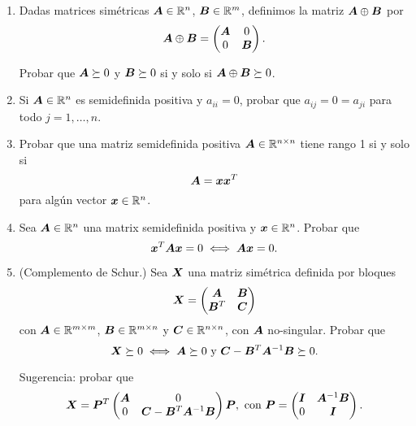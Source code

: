 \documentclass[11pt]{article}
\begin{document}
\begin{enumerate}[resume]
\item
Dadas matrices simétricas $\bm{A} \in \mathbb{R}^{n}$, $\bm{B} \in \mathbb{R}^{m}$, definimos la matriz $\bm{A} \oplus \bm{B}$ por
$$
\bm{A} \oplus \bm{B} =
\begin{pmatrix}
\bm{A} & 0 \\
0 & \bm{B}
\end{pmatrix}.
$$

Probar que $\bm{A} \succeq 0$ y $\bm{B} \succeq 0$ si y solo si $\bm{A} \oplus \bm{B} \succeq 0$.

\item Si $\bm{A} \in \mathbb{R}^{n}$ es semidefinida positiva y $a_{ii} = 0$, probar que $a_{ij} = 0 = a_{ji}$ para todo $j = 1, \dots, n$.

\item Probar que una matriz semidefinida positiva $\bm{A} \in \mathbb{R}^{n\times n}$ tiene rango 1 si y solo si
$$\bm{A} = \bm{x} \bm{x}^T$$
para algún vector $\bm{x} \in \mathbb{R}^{n}$.

\item Sea $\bm{A} \in \mathbb{R}^{n}$ una matrix semidefinida positiva y $\bm{x} \in \mathbb{R}^{n}$. Probar que
$$
\bm{x}^T \bm{A} \bm{x} = 0 \iff \bm{A} \bm{x} = 0.
$$

\item (Complemento de Schur.) Sea $\bm{X}$ una matriz simétrica definida por bloques
$$
\bm{X} = \begin{pmatrix}
\bm{A} & \bm{B} \\
\bm{B}^T & \bm{C}
\end{pmatrix}
$$
con $\bm{A} \in \mathbb{R}^{m \times m}$, $\bm{B} \in \mathbb{R}^{m \times n}$ y $\bm{C} \in \mathbb{R}^{n\times n}$, con $\bm{A}$ no-singular. Probar que
$$
\bm{X} \succeq 0 \iff  \bm{A} \succeq 0 \text{ y } \bm{C} - \bm{B}^T \bm{A}^{-1} \bm{B} \succeq 0 .
$$

Sugerencia: probar que
$$
\bm{X} = \bm{P}^T \begin{pmatrix}
\bm{A} & 0 \\
0 & \bm{C} - \bm{B}^T \bm{A}^{-1} \bm{B}
\end{pmatrix} \bm{P}, \text{ con }
\bm{P} = \begin{pmatrix}
\bm{I} & \bm{A}^{-1} \bm{B} \\
0 & \bm{I}
\end{pmatrix}.
$$


\end{enumerate}
\end{document}
